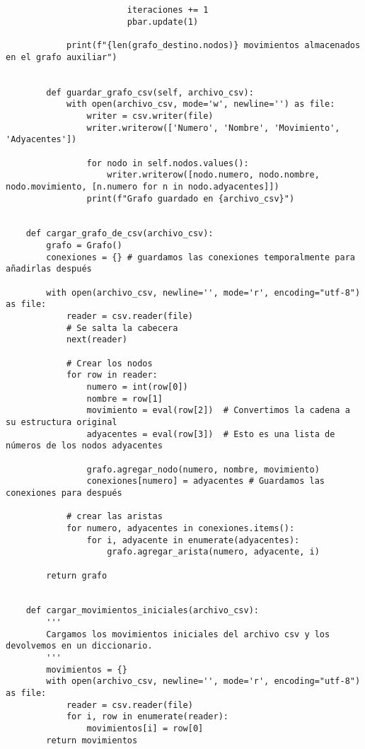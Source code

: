 \begin{lstlisting}
                        iteraciones += 1
                        pbar.update(1)
    
            print(f"{len(grafo_destino.nodos)} movimientos almacenados en el grafo auxiliar")
    
        
        def guardar_grafo_csv(self, archivo_csv):
            with open(archivo_csv, mode='w', newline='') as file:
                writer = csv.writer(file)
                writer.writerow(['Numero', 'Nombre', 'Movimiento', 'Adyacentes'])
                
                for nodo in self.nodos.values():
                    writer.writerow([nodo.numero, nodo.nombre, nodo.movimiento, [n.numero for n in nodo.adyacentes]])
                print(f"Grafo guardado en {archivo_csv}")
    
    
    def cargar_grafo_de_csv(archivo_csv):
        grafo = Grafo()
        conexiones = {} # guardamos las conexiones temporalmente para añadirlas después
        
        with open(archivo_csv, newline='', mode='r', encoding="utf-8") as file:
            reader = csv.reader(file)
            # Se salta la cabecera
            next(reader)
    
            # Crear los nodos
            for row in reader:
                numero = int(row[0])
                nombre = row[1]
                movimiento = eval(row[2])  # Convertimos la cadena a su estructura original 
                adyacentes = eval(row[3])  # Esto es una lista de números de los nodos adyacentes
                
                grafo.agregar_nodo(numero, nombre, movimiento)
                conexiones[numero] = adyacentes # Guardamos las conexiones para después
    
            # crear las aristas
            for numero, adyacentes in conexiones.items():
                for i, adyacente in enumerate(adyacentes):
                    grafo.agregar_arista(numero, adyacente, i)                
        
        return grafo
    
    
    def cargar_movimientos_iniciales(archivo_csv):
        '''
        Cargamos los movimientos iniciales del archivo csv y los devolvemos en un diccionario.
        '''
        movimientos = {}
        with open(archivo_csv, newline='', mode='r', encoding="utf-8") as file:
            reader = csv.reader(file)
            for i, row in enumerate(reader):
                movimientos[i] = row[0]
        return movimientos
    

\end{lstlisting}
